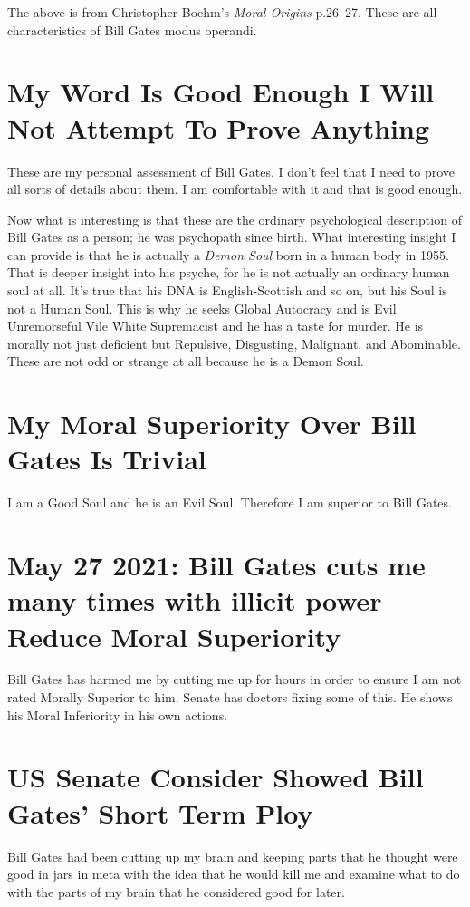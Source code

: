 \documentclass{amsart}
\begin{document}
The above is from Christopher Boehm's {\em Moral Origins} p.26--27.  These are all characteristics of Bill Gates modus operandi.

\section{My Word Is Good Enough I Will Not Attempt To Prove Anything}

These are my personal assessment of Bill Gates.  I don't feel that I need to prove all sorts of details about them.  I am comfortable with it and that is good enough.  

Now what is interesting is that these are the ordinary psychological description of Bill Gates as a person; he was psychopath since birth.  What interesting insight I can provide is that he is actually a {\em Demon Soul} born in a human body in 1955.  That is deeper insight into his psyche, for he is not actually an ordinary human soul at all.  It's true that his DNA is English-Scottish and so on, but his Soul is not a Human Soul.  This is why he seeks Global Autocracy and is Evil Unremorseful Vile White Supremacist and he has a taste for murder.  He is morally not just deficient but Repulsive, Disgusting, Malignant, and Abominable.  These are not odd or strange at all because he is a Demon Soul.

\section{My Moral Superiority Over Bill Gates Is Trivial}

I am a Good Soul and he is an Evil Soul.  Therefore I am superior to Bill Gates.

\section{May 27 2021: Bill Gates cuts me many times with illicit power Reduce Moral Superiority}

Bill Gates has harmed me by cutting me up for hours in order to ensure I am not rated Morally Superior to him.  Senate has doctors fixing some of this.  He shows his Moral Inferiority in his own actions.  

\section{US Senate Consider Showed Bill Gates' Short Term Ploy}

Bill Gates had been cutting up my brain and keeping parts that he thought were good in jars in meta with the idea that he would kill me and examine what to do with the parts of my brain that he considered good for later.
\end{document}
